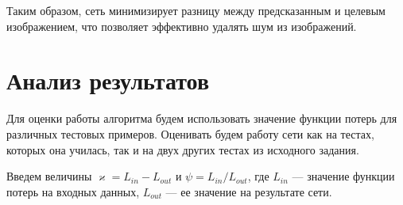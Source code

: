 \documentclass[12pt, a4paper]{article}
\renewcommand{\kappa}{\varkappa}
\begin{document}
Таким образом, сеть минимизирует разницу между предсказанным и целевым изображением, что позволяет эффективно удалять шум из изображений.

\newpage

\section{Анализ результатов}
Для оценки работы алгоритма будем использовать значение функции потерь для различных тестовых примеров. Оценивать будем работу сети как на тестах, которых она училась, так и на двух других тестах из исходного задания. 

Введем величины $\kappa = L_{in} - L_{out}$ и  $\psi =  L_{in} / L_{out}$, где $L_{in}$ --- значение функции потерь на входных данных, $L_{out}$ --- ее значение на результате сети. 
\end{document}
